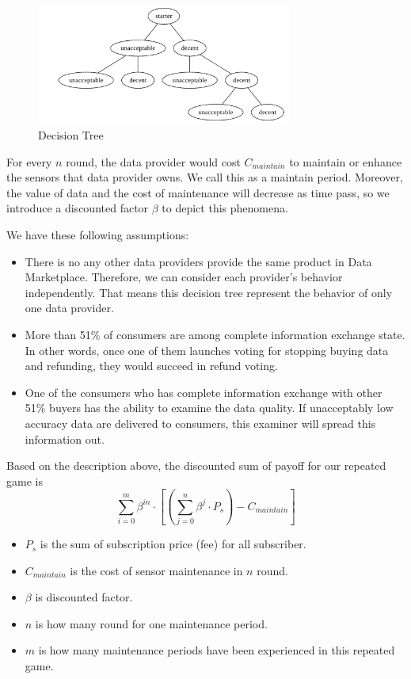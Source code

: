 \documentclass[journal,10pt,a4paper]{IEEEtran}
\begin{document}
\begin{figure} \centering \includegraphics[width=3.3in]{decision_tree} \caption{Decision Tree}
    \label{fig:decision_tree} \end{figure}
For every $n$ round, the data provider would cost $C_{maintain}$ to maintain or enhance the sensors that data provider owns. We call this as a maintain period. Moreover, the value of data and the cost of maintenance will decrease as time pass, so we introduce a discounted factor $\beta$ to depict this phenomena.

We have these following assumptions:
\begin{itemize}
    \item  There is no any other data providers provide the same product in Data Marketplace. Therefore, we can consider each provider's behavior independently. That means this decision tree represent the behavior of only one data provider.
    \item  More than 51\% of consumers are among complete information exchange state. In other words, once one of them launches voting for stopping buying data and refunding, they would succeed in refund voting.
    \item  One of the consumers who has complete information exchange with other 51\% buyers has the ability to examine the data quality. If unacceptably low accuracy data are delivered to consumers, this examiner will spread this information out.
\end{itemize}

Based on the description above, the discounted sum of payoff for our repeated game is
\begin{equation} \label{payoff}
    \sum_{i=0}^{m}{\beta^{in}\cdot [(\sum_{j=0}^{n} \beta^j \cdot P_s) - C_{maintain}]}
\end{equation}

\begin{itemize}
    \item $P_s$ is the sum of subscription price (fee) for all subscriber.
    \item $C_{maintain}$ is the cost of sensor maintenance in $n$ round.
    \item $\beta$ is discounted factor.
    \item $n$ is how many round for one maintenance period.
    \item $m$ is how many maintenance periods have been experienced in this repeated game.
\end{itemize}
\end{document}
